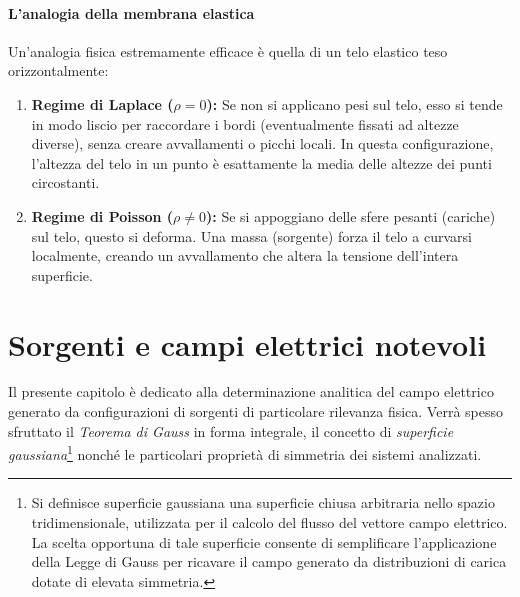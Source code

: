 \documentclass[a4paper,11pt]{report}
\begin{document}
\subsubsection{L'analogia della membrana elastica}
Un'analogia fisica estremamente efficace è quella di un telo elastico teso orizzontalmente:
\begin{enumerate}
    \item \textbf{Regime di Laplace ($\rho = 0$):} Se non si applicano pesi sul telo, esso si tende in modo liscio per raccordare i bordi (eventualmente fissati ad altezze diverse), senza creare avvallamenti o picchi locali. In questa configurazione, l'altezza del telo in un punto è esattamente la media delle altezze dei punti circostanti.
    \item \textbf{Regime di Poisson ($\rho \neq 0$):} Se si appoggiano delle sfere pesanti (cariche) sul telo, questo si deforma. Una massa (sorgente) forza il telo a curvarsi localmente, creando un avvallamento che altera la tensione dell'intera superficie.
\end{enumerate}








\chapter{Sorgenti e campi elettrici notevoli}
Il presente capitolo è dedicato alla determinazione analitica del campo elettrico generato da configurazioni di sorgenti di particolare rilevanza fisica. Verrà spesso sfruttato il \textit{Teorema di Gauss} in forma integrale, il concetto di \textit{superficie gaussiana}\footnote{Si definisce superficie gaussiana una superficie chiusa arbitraria nello spazio tridimensionale, utilizzata per il calcolo del flusso del vettore campo elettrico. La scelta opportuna di tale superficie consente di semplificare l'applicazione della Legge di Gauss per ricavare il campo generato da distribuzioni di carica dotate di elevata simmetria. } nonché le particolari proprietà di simmetria dei sistemi analizzati.
\end{document}
